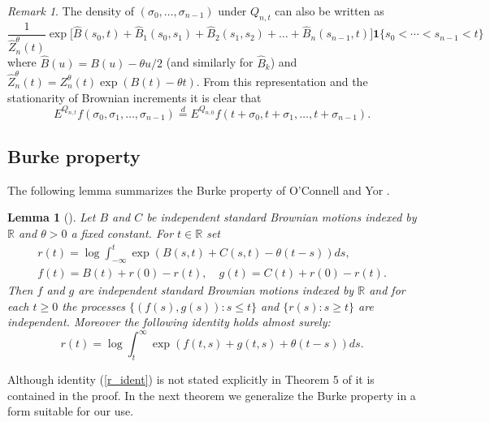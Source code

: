 \documentclass[11pt]{amsart}
\newtheorem{lemma}[theorem]{\sc Lemma}
\numberwithin{equation}{section}
\theoremstyle{remark}
\newtheorem{remark}[theorem]{Remark}
\begin{document}
\begin{remark}\label{remark1}
The density of $(\sigma_0,\dots, \sigma_{n-1})$ under $Q_{n,t}$ can also be written as
\begin{equation}
\frac1{\widehat Z_n^{\theta}(t)}
\exp\bigl[
\widehat B(s_0,t)+\widehat B_1(s_0,s_1)+\widehat B_2(s_1,s_2)+\dots+\widehat B_n(s_{n-1},t)
\bigr]{\mathbf{1}}\{s_0<\dotsm<s_{n-1}<t\}
\label{altQ}\end{equation}
where $\widehat B(u)=B(u)-{\theta} u/2$ (and similarly for $\widehat B_k$) 
and $\widehat Z_n^{\theta}(t)=Z_n^{\theta}(t) \exp(B(t)-{\theta} t)$. From this representation
and the stationarity of Brownian increments it is clear that 
\begin{equation}
E^{Q_{n,t}}f(\sigma_0,\sigma_1,\dotsc,\sigma_{n-1}) {\stackrel{d}{=}} 
E^{Q_{n,0}}f(t+\sigma_0,t+\sigma_1,\dotsc,t+\sigma_{n-1}).
\label{altQ2} \end{equation}
\end{remark}
 
 
\subsection{Burke property}

The following lemma summarizes the Burke property of O'Connell and Yor  \cite[Thm.~5]{oconn-yor-01}.
\begin{lemma}[\cite{oconn-yor-01}]\label{lemburke} Let $B$ and $C$ be independent standard Brownian motions indexed by ${\mathbb{R}}$ and ${\theta}>0$ a fixed constant. For $t\in{\mathbb{R}}$ set 
\begin{align*}
&r(t)=\log\int_{-\infty}^t \exp\left(B(s,t)+C(s,t)-{\theta}(t-s)\right)ds,&\\
&f(t)=B(t)+r(0)-r(t), \quad g(t)=C(t)+r(0)-r(t).&
\end{align*}
Then $f$ and $g$ are independent standard Brownian motions indexed by ${\mathbb{R}}$ and  for each $t\ge0$  the processes $\{(f(s),g(s)):s\le t\}$ and $\{r(s):s\ge t\}$ are independent. Moreover the following identity holds almost surely:
\begin{equation}\label{r_ident}
r(t)=\log\int^{\infty}_t \exp\left(f(t,s)+g(t,s)+{\theta}(t-s)\right)ds.
\end{equation}
\end{lemma}
Although   identity (\ref{r_ident}) is not stated explicitly in Theorem 5 of \cite{oconn-yor-01} it is 
contained in the proof.
In the next theorem we generalize the Burke property in a form suitable for our use.   
\end{document}
